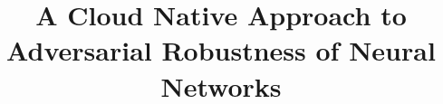 \documentclass[conference]{IEEEtran}
\begin{document}
%
\title{A Cloud Native Approach to Adversarial Robustness of Neural Networks}




% 
\end{document}
